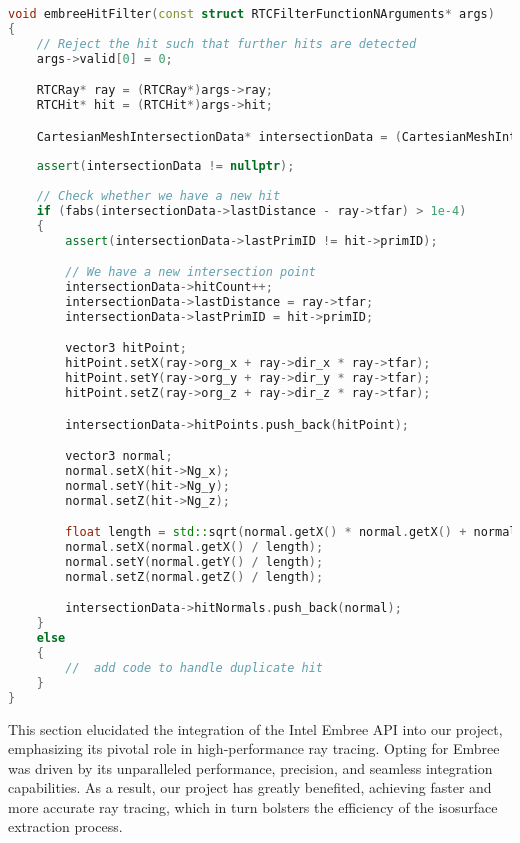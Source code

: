\vspace{2mm}
\begin{lstlisting}[language=c++, caption={Filtering ray intersections using the \texttt{embreeHitFilter} function.}, label=lst:embreeHitFilter]
void embreeHitFilter(const struct RTCFilterFunctionNArguments* args)
{
    // Reject the hit such that further hits are detected
    args->valid[0] = 0; 

    RTCRay* ray = (RTCRay*)args->ray;
    RTCHit* hit = (RTCHit*)args->hit;

    CartesianMeshIntersectionData* intersectionData = (CartesianMeshIntersectionData*)args->geometryUserPtr;
 
    assert(intersectionData != nullptr);
 
    // Check whether we have a new hit
    if (fabs(intersectionData->lastDistance - ray->tfar) > 1e-4)
    {
        assert(intersectionData->lastPrimID != hit->primID);

        // We have a new intersection point
        intersectionData->hitCount++;
        intersectionData->lastDistance = ray->tfar;
        intersectionData->lastPrimID = hit->primID;

        vector3 hitPoint;
        hitPoint.setX(ray->org_x + ray->dir_x * ray->tfar);
        hitPoint.setY(ray->org_y + ray->dir_y * ray->tfar);
        hitPoint.setZ(ray->org_z + ray->dir_z * ray->tfar);

        intersectionData->hitPoints.push_back(hitPoint);

        vector3 normal;
        normal.setX(hit->Ng_x);
        normal.setY(hit->Ng_y);
        normal.setZ(hit->Ng_z);

        float length = std::sqrt(normal.getX() * normal.getX() + normal.getY() * normal.getY() + normal.getZ() * normal.getZ());
        normal.setX(normal.getX() / length);
        normal.setY(normal.getY() / length);
        normal.setZ(normal.getZ() / length);

        intersectionData->hitNormals.push_back(normal);
    }
    else
    {
        //	add code to handle duplicate hit
    }
}
\end{lstlisting}

This section elucidated the integration of the Intel Embree API into our project, emphasizing its pivotal role in high-performance ray tracing. Opting for Embree was driven by its unparalleled performance, precision, and seamless integration capabilities. As a result, our project has greatly benefited, achieving faster and more accurate ray tracing, which in turn bolsters the efficiency of the isosurface extraction process.


